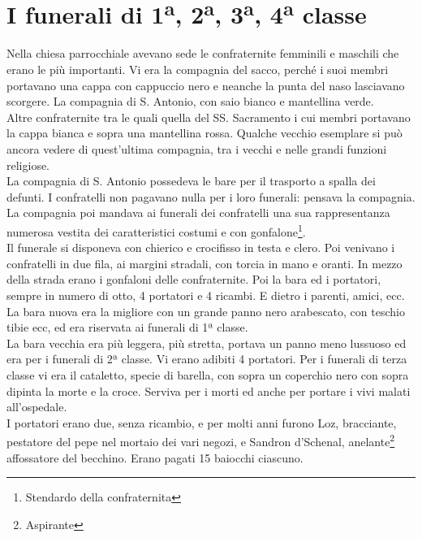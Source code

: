 
\chapter{I funerali di 1\textsuperscript{a}, 2\textsuperscript{a}, 3\textsuperscript{a}, 4\textsuperscript{a} classe}
Nella chiesa parrocchiale avevano sede le confraternite femminili e maschili che erano le più importanti. Vi era la compagnia del sacco, perché i suoi membri portavano una cappa con cappuccio nero e neanche la punta del naso lasciavano scorgere. La compagnia di S. Antonio, con saio bianco e mantellina verde.	\\
Altre confraternite tra le quali quella del SS. Sacramento i cui membri portavano la cappa bianca e sopra una mantellina rossa. Qualche vecchio esemplare si può ancora vedere di quest'ultima compagnia, tra i vecchi e nelle grandi funzioni religiose.\\
La compagnia di S. Antonio possedeva le bare per il trasporto a spalla dei defunti. I confratelli non pagavano nulla per i loro funerali: pensava la compagnia. La compagnia poi mandava ai funerali dei confratelli una sua rappresentanza numerosa vestita dei caratteristici costumi e con gonfalone\footnote{Stendardo della confraternita}.\\
Il funerale si disponeva con chierico e crocifisso in testa e clero. Poi venivano i confratelli in due fila, ai margini stradali, con torcia in mano e oranti. In mezzo della strada erano i gonfaloni delle confraternite. Poi la bara ed i portatori, sempre in numero di otto, 4 portatori e 4 ricambi. E dietro i parenti, amici, ecc. La bara nuova era la migliore con un grande panno nero arabescato, con teschio tibie ecc, ed era riservata ai funerali di 1ª classe. \\
La bara vecchia era più leggera, più stretta, portava un panno meno lussuoso ed era per i funerali di 2ª classe. Vi erano adibiti 4 portatori. Per i funerali di terza classe vi era il cataletto, specie di barella, con sopra un coperchio nero con sopra dipinta la morte e la croce. Serviva per i morti ed anche per portare i vivi malati all'ospedale.\\
I portatori erano due, senza ricambio, e per molti anni furono Loz, bracciante, pestatore del pepe nel mortaio dei vari negozi, e Sandron d'Schenal, anelante\footnote{Aspirante} affossatore del becchino. Erano pagati 15 baiocchi ciascuno.\\
